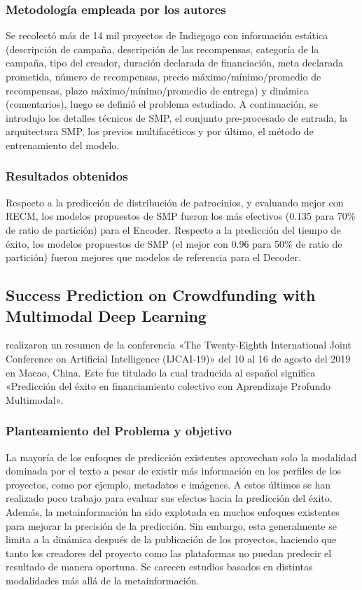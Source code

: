 \subsubsection{Metodología empleada por los autores}
Se recolectó más de 14 mil proyectos de Indiegogo con información estática (descripción de campaña, descripción de las recompensas, categoría de la campaña, tipo del creador, duración declarada de financiación, meta declarada prometida, número de recompensas, precio máximo/mínimo/promedio de recompensas, plazo máximo/mínimo/promedio de entrega) y dinámica (comentarios), luego se definió el problema estudiado. A continuación, se introdujo los detalles técnicos de SMP, el conjunto pre-procesado de entrada, la arquitectura SMP, los previos multifacéticos y por último, el método de entrenamiento del modelo.

\subsubsection{Resultados obtenidos}
Respecto a la predicción de distribución de patrocinios, y evaluando mejor con RECM, los modelos propuestos de SMP fueron los más efectivos (0.135 para 70\% de ratio de partición) para el Encoder.
Respecto a la predicción del tiempo de éxito, los modelos propuestos de SMP (el mejor con 0.96 para 50\% de ratio de partición) fueron mejores que modelos de referencia para el Decoder.

\subsection{Success Prediction on Crowdfunding with Multimodal Deep Learning \citep*{pr_cheng2019deeplearning}}
\citeauthor{pr_cheng2019deeplearning} realizaron un resumen de la conferencia «The Twenty-Eighth International Joint Conference on Artificial Intelligence (IJCAI-19)» del 10 al 16 de agosto del 2019 en Macao, China. Este fue titulado  la cual traducida al español significa «Predicción del éxito en financiamiento colectivo con Aprendizaje Profundo Multimodal».

\subsubsection{Planteamiento del Problema y objetivo}
La mayoría de los enfoques de predicción existentes aprovechan solo la modalidad dominada por el texto a pesar de existir más información en los perfiles de los proyectos, como por ejemplo, metadatos e imágenes. A estos últimos se han realizado poco trabajo para evaluar sus efectos hacia la predicción del éxito. Además, la metainformación ha sido explotada en muchos enfoques existentes para mejorar la precisión de la predicción. Sin embargo, esta generalmente se limita a la dinámica después de la publicación de los proyectos, haciendo que tanto los creadores del proyecto como las plataformas no puedan predecir el resultado de manera oportuna. Se carecen estudios basados en distintas modalidades más allá de la metainformación.

